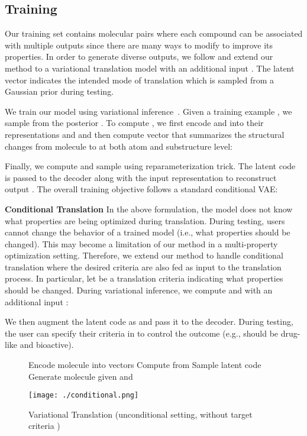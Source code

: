 \documentclass{article} \usepackage{iclr2020_conference,times}
\begin{document}
\subsection{Training}
\label{sec:training}

Our training set contains molecular pairs  where each compound  can be associated with multiple outputs  since there are many ways to modify  to improve its properties. In order to generate diverse outputs, we follow \citet{jin2018learning} and extend our method to a variational translation model  with an additional input . The latent vector  indicates the intended mode of translation which is sampled from a Gaussian prior  during testing.

We train our model using variational inference~\citep{kingma2013auto}. Given a training example , we sample  from the posterior . To compute , we first encode  and  into their representations  and  and then compute vector  that summarizes the structural changes from molecule  to  at both atom and substructure level:

Finally, we compute  and sample  using reparameterization trick. The latent code  is passed to the decoder along with the input representation  to reconstruct output . The overall training objective follows a standard conditional VAE:



\textbf{Conditional Translation } In the above formulation, the model does not know what properties are being optimized during translation. During testing, users cannot change the behavior of a trained model (i.e., what properties should be changed). This may become a limitation of our method in a multi-property optimization setting. Therefore, we extend our method to handle conditional translation where the desired criteria are also fed as input to the translation process. In particular, let  be a translation criteria indicating what properties should be changed. During variational inference, we compute  and   with an additional input :

We then augment the latent code as  and pass it to the decoder.
During testing, the user can specify their criteria in  to control the outcome (e.g.,  should be drug-like and bioactive).

\begin{figure}
\begin{minipage}{0.5\textwidth}
\begin{algorithm}[H]
\begin{algorithmic}[1]
\caption{Variational Translation (unconditional setting, without target criteria )}
\STATE Encode molecule  into vectors 
\STATE Compute  from 
\STATE Sample latent code 
\STATE Generate molecule  given  and 
\ENDFOR
\end{algorithmic}
\end{algorithm}
\end{minipage}
\hfill 
\begin{minipage}{0.48\textwidth}
\vspace{10pt}
\centering
\texttt{[image: ./conditional.png]}
\end{minipage}
\end{figure}
\end{document}
